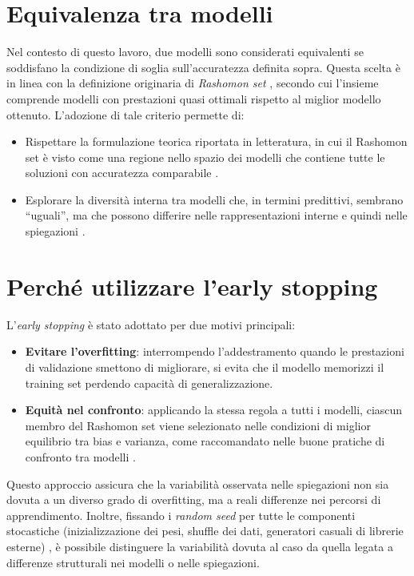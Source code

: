 \documentclass[12pt,a4paper,oneside]{report}
\numberwithin{figure}{chapter}
\numberwithin{table}{chapter}
\begin{document}
\section{Equivalenza tra modelli}
Nel contesto di questo lavoro, due modelli sono considerati equivalenti se
soddisfano la condizione di soglia sull’accuratezza definita sopra. Questa
scelta è in linea con la definizione originaria di \emph{Rashomon set}
\citep{fisher2019all}, secondo cui l’insieme comprende modelli con prestazioni
quasi ottimali rispetto al miglior modello ottenuto. L’adozione di tale
criterio permette di:
\begin{itemize}
      \item Rispettare la formulazione teorica riportata in letteratura, in cui il Rashomon
            set è visto come una regione nello spazio dei modelli che contiene tutte le
            soluzioni con accuratezza comparabile \citep{mueller2023rashomon}.
      \item Esplorare la diversità interna tra modelli che, in termini predittivi, sembrano
            “uguali”, ma che possono differire nelle rappresentazioni interne e quindi
            nelle spiegazioni \citep{leventi2023consistency}.
\end{itemize}

\section{Perché utilizzare l’early stopping}
L’\emph{early stopping} \citep{prechelt1998early} è stato adottato per due
motivi principali:
\begin{itemize}
      \item \textbf{Evitare l’overfitting}: interrompendo l’addestramento quando le prestazioni di validazione smettono di migliorare, si evita che il modello memorizzi il training set perdendo capacità di generalizzazione.
      \item \textbf{Equità nel confronto}: applicando la stessa regola a tutti i modelli, ciascun membro del Rashomon set viene selezionato nelle condizioni di miglior equilibrio tra bias e varianza, come raccomandato nelle buone pratiche di confronto tra modelli \citep{goodfellow2016deep}.
\end{itemize}

Questo approccio assicura che la variabilità osservata nelle spiegazioni non
sia dovuta a un diverso grado di overfitting, ma a reali differenze nei
percorsi di apprendimento. Inoltre, fissando i \emph{random seed} per tutte le
componenti stocastiche (inizializzazione dei pesi, shuffle dei dati, generatori
casuali di librerie esterne) \citep{reimers2017reporting}, è possibile
distinguere la variabilità dovuta al caso da quella legata a differenze
strutturali nei modelli o nelle spiegazioni.
\end{document}
